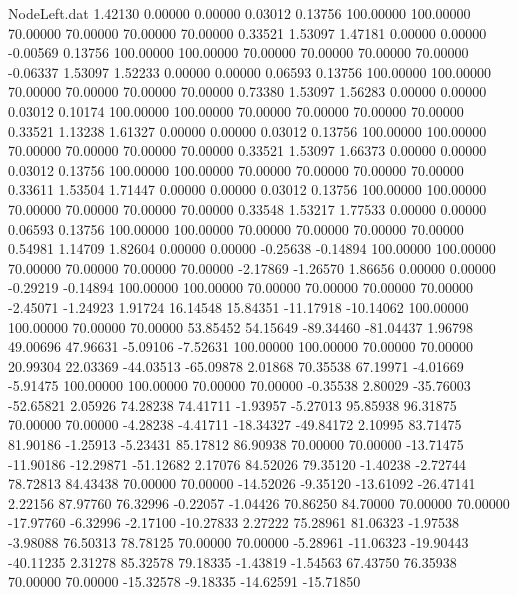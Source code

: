 \begin{filecontents}{NodeLeft.dat}
   1.42130    0.00000    0.00000     0.03012    0.13756  100.00000  100.00000   70.00000   70.00000   70.00000   70.00000    0.33521    1.53097
   1.47181    0.00000    0.00000    -0.00569    0.13756  100.00000  100.00000   70.00000   70.00000   70.00000   70.00000   -0.06337    1.53097
   1.52233    0.00000    0.00000     0.06593    0.13756  100.00000  100.00000   70.00000   70.00000   70.00000   70.00000    0.73380    1.53097
   1.56283    0.00000    0.00000     0.03012    0.10174  100.00000  100.00000   70.00000   70.00000   70.00000   70.00000    0.33521    1.13238
   1.61327    0.00000    0.00000     0.03012    0.13756  100.00000  100.00000   70.00000   70.00000   70.00000   70.00000    0.33521    1.53097
   1.66373    0.00000    0.00000     0.03012    0.13756  100.00000  100.00000   70.00000   70.00000   70.00000   70.00000    0.33611    1.53504
   1.71447    0.00000    0.00000     0.03012    0.13756  100.00000  100.00000   70.00000   70.00000   70.00000   70.00000    0.33548    1.53217
   1.77533    0.00000    0.00000     0.06593    0.13756  100.00000  100.00000   70.00000   70.00000   70.00000   70.00000    0.54981    1.14709
   1.82604    0.00000    0.00000    -0.25638   -0.14894  100.00000  100.00000   70.00000   70.00000   70.00000   70.00000   -2.17869   -1.26570
   1.86656    0.00000    0.00000    -0.29219   -0.14894  100.00000  100.00000   70.00000   70.00000   70.00000   70.00000   -2.45071   -1.24923
   1.91724   16.14548   15.84351   -11.17918  -10.14062  100.00000  100.00000   70.00000   70.00000   53.85452   54.15649  -89.34460  -81.04437
   1.96798   49.00696   47.96631    -5.09106   -7.52631  100.00000  100.00000   70.00000   70.00000   20.99304   22.03369  -44.03513  -65.09878
   2.01868   70.35538   67.19971    -4.01669   -5.91475  100.00000  100.00000   70.00000   70.00000   -0.35538    2.80029  -35.76003  -52.65821
   2.05926   74.28238   74.41711    -1.93957   -5.27013   95.85938   96.31875   70.00000   70.00000   -4.28238   -4.41711  -18.34327  -49.84172
   2.10995   83.71475   81.90186    -1.25913   -5.23431   85.17812   86.90938   70.00000   70.00000  -13.71475  -11.90186  -12.29871  -51.12682
   2.17076   84.52026   79.35120    -1.40238   -2.72744   78.72813   84.43438   70.00000   70.00000  -14.52026   -9.35120  -13.61092  -26.47141
   2.22156   87.97760   76.32996    -0.22057   -1.04426   70.86250   84.70000   70.00000   70.00000  -17.97760   -6.32996   -2.17100  -10.27833
   2.27222   75.28961   81.06323    -1.97538   -3.98088   76.50313   78.78125   70.00000   70.00000   -5.28961  -11.06323  -19.90443  -40.11235
   2.31278   85.32578   79.18335    -1.43819   -1.54563   67.43750   76.35938   70.00000   70.00000  -15.32578   -9.18335  -14.62591  -15.71850

\end{filecontents}
